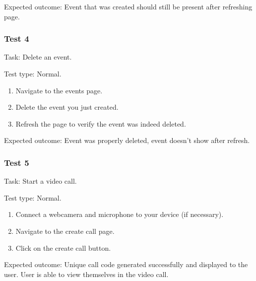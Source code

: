 {\sffamily Expected outcome: } Event that was created should still be present after refreshing page. \\

{\color{gray} \hrulefill}

\subsubsection{Test 4}

{\sffamily Task:} Delete an event.\\

{\color{gray} \hrulefill}

{\sffamily Test type: Normal.} \\

\begin{enumerate}
  \item Navigate to the events page. \\
  \item Delete the event you just created. \\
  \item Refresh the page to verify the event was indeed deleted. \\
\end{enumerate}

{\sffamily Expected outcome: } Event was properly deleted, event doesn't show after refresh. \\

{\color{gray} \hrulefill}

\subsubsection{Test 5}

{\sffamily Task:} Start a video call.\\

{\color{gray} \hrulefill}

{\sffamily Test type: Normal.}\\

\begin{enumerate}
  \item Connect a webcamera and microphone to your device (if necessary).
  \item Navigate to the create call page.
  \item Click on the create call button.
\end{enumerate}

{\sffamily Expected outcome:} Unique call code generated successfully
and displayed to the user. User is able to view themselves in
the video call.\\

